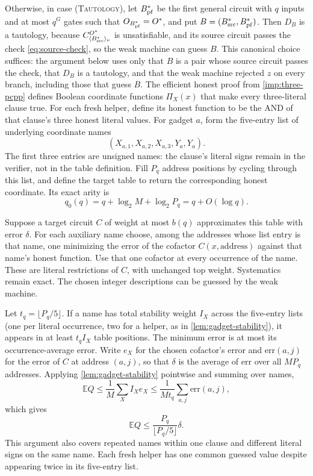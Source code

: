 \documentclass[11pt,letterpaper]{article}
\theoremstyle{definition}
\theoremstyle{remark}
\begin{document}
Otherwise, in case (\textsc{Tautology}), let $B^*_{\rm pf}$ be the first
general circuit with $q$ inputs and at most $q^G$ gates such that
$O_{B^*_{\rm pf}}=O^*$, and put
$B=(B^*_{\rm src},B^*_{\rm pf})$. Then $D_B$ is a tautology, because
$C^{O^*}_{\langle B^*_{\rm src}\rangle_\nu}$ is unsatisfiable, and its
source circuit passes the check \eqref{eq:source-check}, so the weak
machine can guess $B$. This canonical choice suffices: the argument
below uses only that $B$ is a pair whose source circuit passes the
check, that $D_B$ is a tautology, and that the weak machine rejected $z$
on every branch, including those that guess $B$. The efficient honest proof from
\cref{imp:three-pcpp} defines Boolean coordinate functions $\Pi_X(x)$
that make every three-literal clause true. For each fresh helper, define its
honest function to be the AND of that clause's three honest literal
values. For gadget $a$, form the five-entry list of underlying
coordinate names
\[
 (X_{a,1},X_{a,2},X_{a,3},Y_a,Y_a).
\]
The first three entries are unsigned names: the clause's literal
signs remain in the verifier, not in the table definition. Fill
$P_q$ address positions by cycling through this list, and define
the target table to return the corresponding honest coordinate.
Its exact arity is
\begin{equation}\label{eq:gadget-table-arity}
 q_0(q)=q+\log_2M+\log_2P_q=q+O(\log q).
\end{equation}

Suppose a target circuit $C$ of weight at most $b(q)$ approximates
this table with error $\delta$. For each auxiliary name choose,
among the addresses whose list entry is that name, one minimizing
the error of the cofactor
$C(x,\text{address})$ against that name's honest function. Use that
one cofactor at every occurrence of the name. These are literal
restrictions of $C$, with unchanged top weight. Systematics remain
exact. The chosen integer descriptions can be guessed by the weak
machine.

Let $t_q=\lfloor P_q/5\rfloor$. If a name has total stability weight
$I_X$ across the five-entry lists (one per literal occurrence, two
for a helper, as in \cref{lem:gadget-stability}), it appears in at
least $t_qI_X$
table positions. The minimum error is at most its occurrence-average
error. Write $e_X$ for the chosen cofactor's error and
$\mathrm{err}(a,j)$ for the error of $C$ at address $(a,j)$, so that
$\delta$ is the average of $\mathrm{err}$ over all $MP_q$ addresses.
Applying \cref{lem:gadget-stability} pointwise and summing over names,
\[
 \mathbb E Q\le\frac1M\sum_XI_Xe_X
 \le\frac1{Mt_q}\sum_{a,j}\mathrm{err}(a,j),
\]
which gives
\begin{equation}\label{eq:gadget-table-error}
 \mathbb E Q\le\frac{P_q}{\lfloor P_q/5\rfloor}\delta.
\end{equation}
This argument also covers repeated names within one clause and
different literal signs on the same name. Each fresh helper has one
common guessed value despite appearing twice in its five-entry list.
\end{document}
